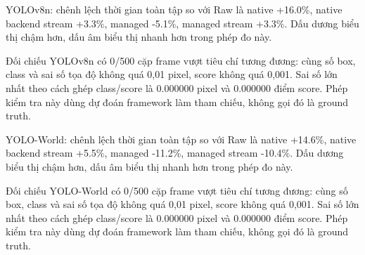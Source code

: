 YOLOv8n: chênh lệch thời gian toàn tập so với Raw là native +16.0\%, native backend stream +3.3\%, managed -5.1\%, managed stream +3.3\%. Dấu dương biểu thị chậm hơn, dấu âm biểu thị nhanh hơn trong phép đo này.

Đối chiếu YOLOv8n có 0/500 cặp frame vượt tiêu chí tương đương: cùng số box, class và sai số tọa độ không quá 0,01 pixel, score không quá 0,001. Sai số lớn nhất theo cách ghép class/score là 0.000000 pixel và 0.000000 điểm score. Phép kiểm tra này dùng dự đoán framework làm tham chiếu, không gọi đó là ground truth.

YOLO-World: chênh lệch thời gian toàn tập so với Raw là native +14.6\%, native backend stream +5.5\%, managed -11.2\%, managed stream -10.4\%. Dấu dương biểu thị chậm hơn, dấu âm biểu thị nhanh hơn trong phép đo này.

Đối chiếu YOLO-World có 0/500 cặp frame vượt tiêu chí tương đương: cùng số box, class và sai số tọa độ không quá 0,01 pixel, score không quá 0,001. Sai số lớn nhất theo cách ghép class/score là 0.000000 pixel và 0.000000 điểm score. Phép kiểm tra này dùng dự đoán framework làm tham chiếu, không gọi đó là ground truth.
